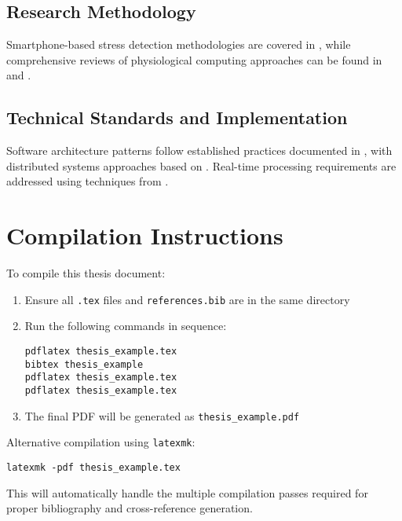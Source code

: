 \documentclass[12pt,a4paper]{report}
\begin{document}
\section*{Research Methodology}
Smartphone-based stress detection methodologies are covered in \cite{InstantStressSmartphone2019}, while comprehensive reviews of physiological computing approaches can be found in \cite{ReviewPhysiologicalComputing2021} and \cite{StressRecognitionReview2019}.

\section*{Technical Standards and Implementation}
Software architecture patterns follow established practices documented in \cite{SoftwareArchitecturePatterns2017}, with distributed systems approaches based on \cite{DistributedSystems2017}. Real-time processing requirements are addressed using techniques from \cite{RealTimeProcessing2018}.




\chapter*{Compilation Instructions}

To compile this thesis document:

\begin{enumerate}
\item Ensure all \texttt{.tex} files and \texttt{references.bib} are in the same directory
\item Run the following commands in sequence:
\begin{verbatim}
pdflatex thesis_example.tex
bibtex thesis_example
pdflatex thesis_example.tex
pdflatex thesis_example.tex
\end{verbatim}
\item The final PDF will be generated as \texttt{thesis\_example.pdf}
\end{enumerate}

Alternative compilation using \texttt{latexmk}:
\begin{verbatim}
latexmk -pdf thesis_example.tex
\end{verbatim}

This will automatically handle the multiple compilation passes required for proper bibliography and cross-reference generation.
\end{document}

